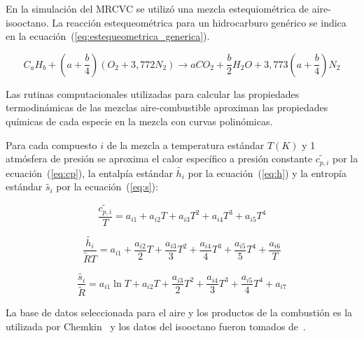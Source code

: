 En la simulación del MRCVC se utilizó una mezcla estequiométrica de
aire-isooctano.
%
La reacción estequeométrica para un hidrocarburo genérico se indica en la
ecuación~(\ref{eq:estequeometrica_generica}).

\begin{equation} \label{eq:estequeometrica_generica}
  C_{a}H_{b} + \left(a + \frac{b}{4}\right) \left(O_{2}+3,772N_{2}\right) \rightarrow a CO_{2} + \frac{b}{2} H_{2}O + 3,773 \left(a + \frac{b}{4}\right) N_{2}
\end{equation}

Las rutinas computacionales utilizadas para calcular las propiedades
termodinámicas de las mezclas aire-combustible aproximan las propiedades
químicas de cada especie en la mezcla con curvas polinómicas.

Para cada compuesto $i$ de la mezcla a temperatura estándar $T(K)$ y 1 atmósfera
de presión se aproxima el calor específico a presión constante
$\widetilde{c_{p,i}}$ por la ecuación~(\ref{eq:cp}), la entalpía estándar
$\widetilde{h_{i}}$ por la ecuación~(\ref{eq:h}) y la entropía estándar
$\widetilde{s_{i}}$ por la ecuación~(\ref{eq:s}):


\begin{equation}\label{eq:cp} \frac{\widetilde{c_{p,i}}}{T} = a_{i1} + a_{i2}T + a_{i3}T^{2} + a_{i4}T^{3} + a_{i5}T^{4}
\end{equation}

\begin{equation}\label{eq:h} \frac{\widetilde{h_{i}}}{\widetilde{R}T} = a_{i1} + \frac{a_{i2}}{2}T + \frac{a_{i3}}{3}T^{2} + \frac{a_{i4}}{4}T^{3} + \frac{a_{i5}}{5}T^{4} +\frac{a_{i6}}{T}
\end{equation}

\begin{equation}\label{eq:s} \frac{\widetilde{s_{i}}}{\widetilde{R}} = a_{i1} \ln{T} + a_{i2}T + \frac{a_{i3}}{2}T^{2} + \frac{a_{i4}}{3}T^{3} + \frac{a_{i5}}{4}T^{4} + a_{i7}
\end{equation}


La base de datos seleccionada para el aire y los productos de la combustión es
la utilizada por Chemkin~\parencite{chemkin} y los datos del isooctano fueron
tomados de~\parencite{raine}.

